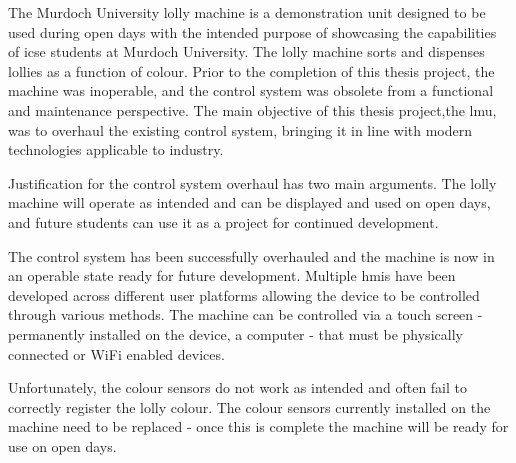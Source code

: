 The Murdoch University lolly machine is a demonstration unit designed to be used during open days with the intended purpose of showcasing the capabilities of \acrlong{icse} students at Murdoch University. The lolly machine sorts and dispenses lollies as a function of colour.  Prior to the completion of this thesis project, the machine was inoperable, and the control system was obsolete from a functional and maintenance perspective. The main objective of this thesis project,the \acrlong{lmu}, was to overhaul the existing control system, bringing it in line with modern technologies applicable to industry. 

Justification for the control system overhaul has two main arguments. The lolly machine will operate as intended and can be displayed and used on open days, and future students can use it as a project for continued development. 

The control system has been successfully overhauled and the machine is now in an operable state ready for future development. Multiple \acrlong{hmi}s have been developed across different user platforms allowing the device to be controlled through various methods. The machine can be controlled via a touch screen -  permanently installed on the device, a computer - that must be physically connected or WiFi enabled devices. 

Unfortunately, the colour sensors do not work as intended and often fail to correctly register the lolly colour. The colour sensors currently installed on the machine need to be replaced - once this is complete the machine will be ready for use on open days. 